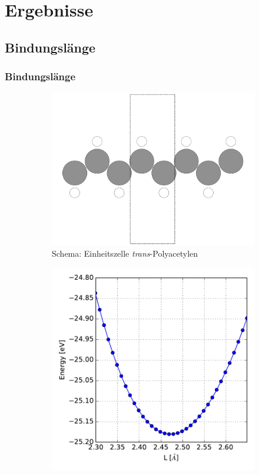 \section{Ergebnisse}

\subsection{Bindungslänge}
\begin{frame}
\frametitle{Bindungslänge}
\begin{figure}[]
	\centering
	\begin{subfigure}{0.35\textwidth}
	\includegraphics[width = \textwidth]{Images/polyacetylene/convergence/polyacetylene_nice_unit_cell}
	\caption{Schema: Einheitszelle \emph{trans}-Polyacetylen}
	\end{subfigure}\hspace*{1cm}
	\begin{subfigure}{0.45\textwidth}
		\centering
		\includegraphics[width = \textwidth]{Images/polyacetylene/convergence/unit_cell_length}

\end{subfigure}
\end{figure}
\end{frame}
